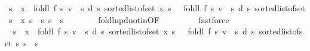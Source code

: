 \begin{isabellebody}
\ {\isachardoublequoteopen}s\ {\isacharless}{\kern0pt}\ x\ {\isasymLongrightarrow}\ foldl\ {\isacharquery}{\kern0pt}f\ {\isacharparenleft}{\kern0pt}{\isasymlambda}s{\isachardot}{\kern0pt}\ {\isacharparenleft}{\kern0pt}v\ {\isachardollar}{\kern0pt}\ s{\isacharcomma}{\kern0pt}\ d\ s{\isacharparenright}{\kern0pt}{\isacharparenright}{\kern0pt}\ {\isacharparenleft}{\kern0pt}sorted{\isacharunderscore}{\kern0pt}list{\isacharunderscore}{\kern0pt}of{\isacharunderscore}{\kern0pt}set\ {\isacharbraceleft}{\kern0pt}{\isachardot}{\kern0pt}{\isachardot}{\kern0pt}x{\isacharprime}{\kern0pt}{\isacharbraceright}{\kern0pt}{\isacharparenright}{\kern0pt}\ s\ {\isacharequal}{\kern0pt}\ \ foldl\ {\isacharquery}{\kern0pt}f\ {\isacharparenleft}{\kern0pt}{\isasymlambda}s{\isachardot}{\kern0pt}\ {\isacharparenleft}{\kern0pt}v\ {\isachardollar}{\kern0pt}\ s{\isacharcomma}{\kern0pt}\ d\ s{\isacharparenright}{\kern0pt}{\isacharparenright}{\kern0pt}\ {\isacharparenleft}{\kern0pt}sorted{\isacharunderscore}{\kern0pt}list{\isacharunderscore}{\kern0pt}of{\isacharunderscore}{\kern0pt}set\ {\isacharbraceleft}{\kern0pt}s{\isacharprime}{\kern0pt}\ {\isasymin}\ {\isacharbraceleft}{\kern0pt}{\isachardot}{\kern0pt}{\isachardot}{\kern0pt}x{\isacharprime}{\kern0pt}{\isacharbraceright}{\kern0pt}{\isachardot}{\kern0pt}\ s{\isacharprime}{\kern0pt}\ {\isasymle}\ s{\isacharbraceright}{\kern0pt}{\isacharparenright}{\kern0pt}\ s{\isachardoublequoteclose}\ \ s\isanewline
\ \ \ \ \ \ \isamarkupfalse%
\ foldl{\isacharunderscore}{\kern0pt}upd{\isacharunderscore}{\kern0pt}notin{\isacharprime}{\kern0pt}{\isacharbrackleft}{\kern0pt}OF\ {}{\isacharbrackright}{\kern0pt}\isanewline
\ \ \ \ \ \ \isamarkupfalse%
\ fastforce\isanewline
\ \ \ \ \isamarkupfalse%
\ {}{\isacharcolon}{\kern0pt}\ {\isachardoublequoteopen}s\ {\isacharless}{\kern0pt}\ x\ {\isasymLongrightarrow}\ foldl\ {\isacharquery}{\kern0pt}f\ {\isacharparenleft}{\kern0pt}{\isasymlambda}s{\isachardot}{\kern0pt}\ {\isacharparenleft}{\kern0pt}v\ {\isachardollar}{\kern0pt}\ s{\isacharcomma}{\kern0pt}\ d\ s{\isacharparenright}{\kern0pt}{\isacharparenright}{\kern0pt}\ {\isacharparenleft}{\kern0pt}sorted{\isacharunderscore}{\kern0pt}list{\isacharunderscore}{\kern0pt}of{\isacharunderscore}{\kern0pt}set\ {\isacharbraceleft}{\kern0pt}{\isachardot}{\kern0pt}{\isachardot}{\kern0pt}x{\isacharprime}{\kern0pt}{\isacharbraceright}{\kern0pt}{\isacharparenright}{\kern0pt}\ s\ {\isacharequal}{\kern0pt}\ \ foldl\ {\isacharquery}{\kern0pt}f\ {\isacharparenleft}{\kern0pt}{\isasymlambda}s{\isachardot}{\kern0pt}\ {\isacharparenleft}{\kern0pt}v\ {\isachardollar}{\kern0pt}\ s{\isacharcomma}{\kern0pt}\ d\ s{\isacharparenright}{\kern0pt}{\isacharparenright}{\kern0pt}\ {\isacharparenleft}{\kern0pt}sorted{\isacharunderscore}{\kern0pt}list{\isacharunderscore}{\kern0pt}of{\isacharunderscore}{\kern0pt}set\ {\isacharbraceleft}{\kern0pt}{\isachardot}{\kern0pt}{\isachardot}{\kern0pt}s{\isacharbraceright}{\kern0pt}{\isacharparenright}{\kern0pt}\ s{\isachardoublequoteclose}\ \ s\isanewline

\end{isabellebody}
